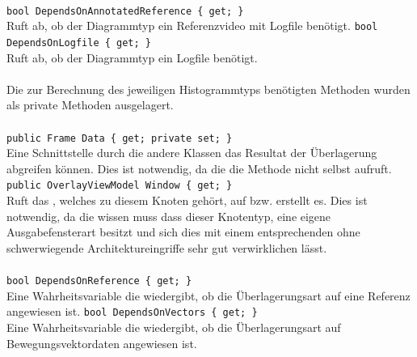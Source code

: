 \paragraph{}
\begin{itemize}
	\add \verb!bool DependsOnAnnotatedReference { get; }! \\
	Ruft ab, ob der Diagrammtyp ein Referenzvideo mit Logfile benötigt.
	\add \verb!bool DependsOnLogfile { get; }! \\
	Ruft ab, ob der Diagrammtyp ein Logfile benötigt.
\end{itemize}

\paragraph{}
Die zur Berechnung des jeweiligen Histogrammtyps benötigten Methoden wurden als private Methoden ausgelagert.

\paragraph{}
\begin{itemize}
	\add \verb!public Frame Data { get; private set; }! \\
	Eine Schnittstelle durch die andere Klassen das Resultat der Überlagerung abgreifen können. Dies ist notwendig, da die  die  Methode nicht selbst aufruft.
	\add \verb!public OverlayViewModel Window { get; }! \\
	Ruft das , welches zu diesem Knoten gehört, auf bzw. erstellt es. Dies ist notwendig, da die  wissen muss dass dieser Knotentyp, eine eigene Ausgabefensterart besitzt und sich dies mit einem entsprechenden  ohne schwerwiegende Architektureingriffe sehr gut verwirklichen lässt.
\end{itemize}

\paragraph{}
\begin{itemize}
	\add \verb!bool DependsOnReference { get; }! \\
	Eine Wahrheitsvariable die wiedergibt, ob die Überlagerungsart auf eine Referenz angewiesen ist.
	\add \verb!bool DependsOnVectors { get; }! \\
	Eine Wahrheitsvariable die wiedergibt, ob die Überlagerungsart auf Bewegungsvektordaten angewiesen ist.
\end{itemize}

